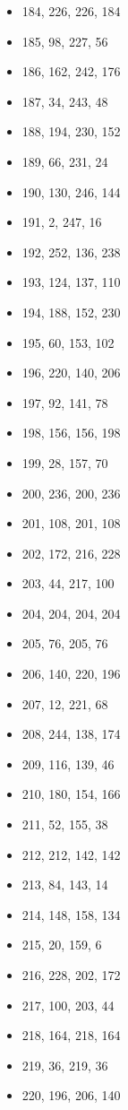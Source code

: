 \documentclass[12pt, fleqn]{report}                             %
\theoremstyle{break}                                            %
\begin{document}
\begin{itemize}
        \item 184, 226, 226, 184
        \item 185, 98, 227, 56
        \item 186, 162, 242, 176
        \item 187, 34, 243, 48
        \item 188, 194, 230, 152
        \item 189, 66, 231, 24
        \item 190, 130, 246, 144
        \item 191, 2, 247, 16
        \item 192, 252, 136, 238
        \item 193, 124, 137, 110
        \item 194, 188, 152, 230
        \item 195, 60, 153, 102
        \item 196, 220, 140, 206
        \item 197, 92, 141, 78
        \item 198, 156, 156, 198
        \item 199, 28, 157, 70
        \item 200, 236, 200, 236
        \item 201, 108, 201, 108
        \item 202, 172, 216, 228
        \item 203, 44, 217, 100
        \item 204, 204, 204, 204
        \item 205, 76, 205, 76
        \item 206, 140, 220, 196
        \item 207, 12, 221, 68
        \item 208, 244, 138, 174
        \item 209, 116, 139, 46
        \item 210, 180, 154, 166
        \item 211, 52, 155, 38
        \item 212, 212, 142, 142
        \item 213, 84, 143, 14
        \item 214, 148, 158, 134
        \item 215, 20, 159, 6
        \item 216, 228, 202, 172
        \item 217, 100, 203, 44
        \item 218, 164, 218, 164
        \item 219, 36, 219, 36
        \item 220, 196, 206, 140

\end{itemize}
\end{document}
